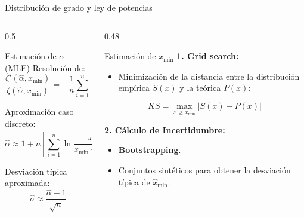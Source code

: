 \documentclass[aspectratio=169, 11pt, xcolor=table]{beamer}
\begin{document}
	\begin{frame}{Distribución de grado y ley de potencias}
		\vspace*{-0.5cm}
		\begin{columns}[T]
			
			\begin{column}{0.5\textwidth}
				\begin{block}{Estimación de $\alpha$ (MLE)}
					Resolución de:
					\begin{equation*}
					\frac{\zeta'(\hat{\alpha}, x_{\min})}{\zeta(\hat{\alpha}, x_{\min})} = -\frac{1}{n} \sum_{i=1}^n \ln x_i
					\end{equation*}
					
					Aproximación caso discreto:
					\begin{equation*}
					\hat{\alpha} \approx 1 + n \left[ \sum_{i=1}^n \ln \frac{x_i}{x_{\min} - 0.5} \right]^{-1}
					\end{equation*}
					
					Desviación típica aproximada:
					\begin{equation*}
					\hat{\sigma} \approx \frac{\hat{\alpha}-1}{\sqrt{n}}
					\end{equation*}
				\end{block}
			\end{column}
			
			\begin{column}{0.48\textwidth}
				\begin{exampleblock}{Estimación de $x_{\min}$}
					\textbf{1. Grid search:}
					\begin{itemize}
						\item Minimización de la distancia entre la distribución empírica $S(x)$ y la teórica $P(x)$:
					\end{itemize}
					\begin{equation*}
					KS = \max_{x \ge x_{\min}} |S(x) - P(x)|
					\end{equation*}
					
					\vspace{0.2cm}
					
					\textbf{2. Cálculo de Incertidumbre:}
					\begin{itemize}
						\item \textbf{Bootstrapping}.
						\item Conjuntos sintéticos para obtener la desviación típica de $\hat{x}_{\min}$.
					\end{itemize}
				\end{exampleblock}
			\end{column}
			
		\end{columns}
	\end{frame}
	
\end{document}
